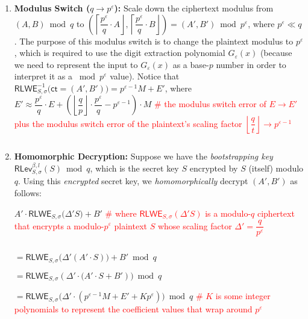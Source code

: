\begin{enumerate}
\item \textbf{Modulus Switch (\boldmath$q \rightarrow p^\varepsilon$):} Scale down the ciphertext modulus from $(A, B) \bmod q$ to $\left(\left\lceil \dfrac{p^\varepsilon}{q}\cdot A\right\rfloor, \left\lceil \dfrac{p^\varepsilon}{q}\cdot B\right\rfloor\right) = (A', B') \bmod p^\varepsilon$, where $p^\varepsilon \ll q$. The purpose of this modulus switch is to change the plaintext modulus to $p^\varepsilon$, which is required to use the digit extraction polynomial $G_\varepsilon(x)$ (because we need to represent the input to $G_\varepsilon(x)$ as a base-$p$ number in order to interpret it as a $\bmod p^\varepsilon$ value). Notice that $\textsf{RLWE}_{S, \sigma}^{-1}\bm(\textsf{ct} = (A', B') \bm) = p^{\varepsilon-1}M + E'$, where $E' \approx \dfrac{p^\varepsilon}{q}\cdot E  + \left(\left\lfloor\dfrac{q}{p}\right\rfloor\cdot\dfrac{p^\varepsilon}{q} - p^{\varepsilon-1}\right)\cdot M$ \textcolor{red}{ \# the modulus switch error of $E \rightarrow E'$ plus the modulus switch error of the plaintext's scaling factor $\left\lfloor\dfrac{q}{t}\right\rfloor \rightarrow p^{\varepsilon-1}$}

$ $

\item \textbf{Homomorphic Decryption:} Suppose we have the \textit{bootstrapping key} $\textsf{RLev}_{S, \sigma}^{\beta, l}(S) \bmod q$, which is the secret key $S$ encrypted by $S$ (itself) modulo $q$. Using this \textit{encrypted} secret key, we \textit{homomorphically} decrypt $(A', B')$ as follows:

$A' \cdot \textsf{RLWE}_{S, \sigma}\bm(\Delta' S\bm) + B'$ \textcolor{red}{ \# where $\textsf{RLWE}_{S, \sigma}(\Delta' S)$ is a modulo-$q$ ciphertext that encrypts a modulo-$p^\varepsilon$ plaintext $S$ whose scaling factor $\Delta' = \dfrac{q}{p^\varepsilon}$ }

$ $

$= \textsf{RLWE}_{S, \sigma}\bm(\Delta' (A' \cdot S)\bm) + B'  \bmod q$

$= \textsf{RLWE}_{S, \sigma}(\Delta' \cdot \bm(A'\cdot S + B')\bm) \bmod q$

$ = \textsf{RLWE}_{S, \sigma}\bm(\Delta' \cdot (p^{\varepsilon-1} M  + E' + Kp^\varepsilon)\bm) \bmod q$ \textcolor{red}{ \# $K$ is some integer polynomials to represent the coefficient values that wrap around $p^\varepsilon$}




\end{enumerate}
